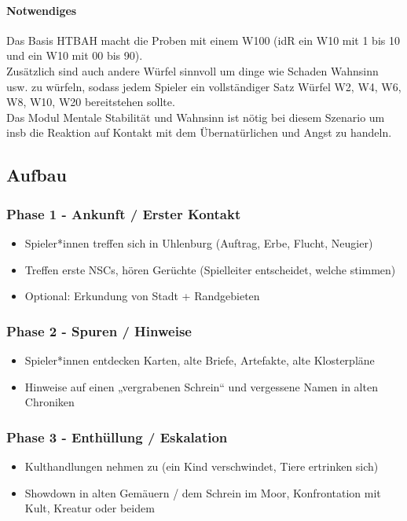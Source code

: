 \paragraph{Notwendiges}
Das Basis HTBAH macht die Proben mit einem W100 (idR ein W10 mit 1 bis 10 und ein W10 mit 00 bis 90).\\
Zusätzlich sind auch andere Würfel sinnvoll um dinge wie Schaden Wahnsinn usw. zu würfeln, sodass jedem Spieler ein vollständiger Satz Würfel W2, W4, W6, W8, W10, W20 bereitstehen sollte.\\
Das Modul Mentale Stabilität und Wahnsinn ist nötig bei diesem Szenario um insb die Reaktion auf Kontakt mit dem Übernatürlichen und Angst zu handeln.

\newpage
\subsection{Aufbau}
\subsubsection{Phase 1 - Ankunft / Erster Kontakt}
\begin{itemize}
\item Spieler*innen treffen sich in Uhlenburg (Auftrag, Erbe, Flucht, Neugier)
\item Treffen erste NSCs, hören Gerüchte (Spielleiter entscheidet, welche stimmen)
\item Optional: Erkundung von Stadt + Randgebieten
\end{itemize}
\subsubsection{Phase 2 - Spuren / Hinweise}
\begin{itemize}
\item Spieler*innen entdecken Karten, alte Briefe, Artefakte, alte Klosterpläne
\item Hinweise auf einen „vergrabenen Schrein“ und vergessene Namen in alten Chroniken
\end{itemize}
\subsubsection{Phase 3 - Enthüllung / Eskalation}
\begin{itemize}
\item Kulthandlungen nehmen zu (ein Kind verschwindet, Tiere ertrinken sich)
\item Showdown in alten Gemäuern / dem Schrein im Moor, Konfrontation mit Kult, Kreatur oder beidem
\end{itemize}
